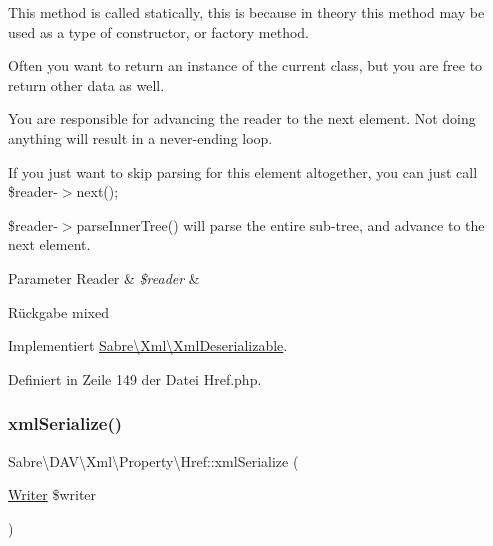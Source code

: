 This method is called statically, this is because in theory this method may be used as a type of constructor, or factory method.

Often you want to return an instance of the current class, but you are free to return other data as well.

You are responsible for advancing the reader to the next element. Not doing anything will result in a never-\/ending loop.

If you just want to skip parsing for this element altogether, you can just call \$reader-\/$>$next();

\$reader-\/$>$parse\+Inner\+Tree() will parse the entire sub-\/tree, and advance to the next element.


\begin{DoxyParams}[1]{Parameter}
Reader & {\em \$reader} & \\
\hline
\end{DoxyParams}
\begin{DoxyReturn}{Rückgabe}
mixed 
\end{DoxyReturn}


Implementiert \mbox{\hyperlink{interface_sabre_1_1_xml_1_1_xml_deserializable_a19e0eca545b9a0d93f7d6b69085ade30}{Sabre\textbackslash{}\+Xml\textbackslash{}\+Xml\+Deserializable}}.



Definiert in Zeile 149 der Datei Href.\+php.

\mbox{\label{class_sabre_1_1_d_a_v_1_1_xml_1_1_property_1_1_href_ad1a4047eb7d32ddbf52aba7f5125f9fa}} 
\subsubsection{\texorpdfstring{xml\+Serialize()}{xmlSerialize()}}
{\footnotesize\ttfamily Sabre\textbackslash{}\+D\+A\+V\textbackslash{}\+Xml\textbackslash{}\+Property\textbackslash{}\+Href\+::xml\+Serialize (\begin{DoxyParamCaption}\item[{\mbox{\hyperlink{class_sabre_1_1_xml_1_1_writer}{Writer}}}]{\$writer }\end{DoxyParamCaption})}

